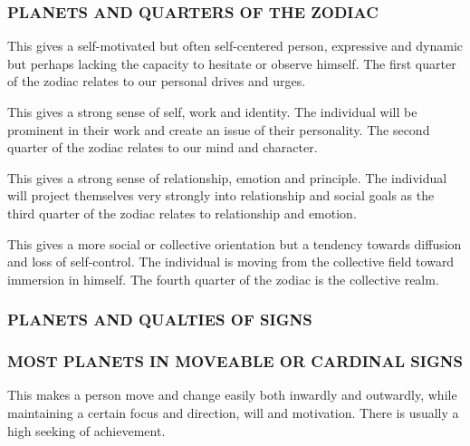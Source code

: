  

\subsubsection{PLANETS AND QUARTERS OF THE ZODIAC}


This gives a self-motivated but often self-centered person, expressive and dynamic but perhaps lacking the capacity to hesitate or observe himself. The first quarter of the zodiac relates to our personal drives and urges.

 


This gives a strong sense of self, work and identity. The individual will be prominent in their work and create an issue of their personality. The second quarter of the zodiac relates to our mind and character.

 


This gives a strong sense of relationship, emotion and principle. The individual will project themselves very strongly into relationship and social goals as the third quarter of the zodiac relates to relationship and emotion.

 


This gives a more social or collective orientation but a tendency towards diffusion and loss of self-control. The individual is moving from the collective field toward immersion in himself. The fourth quarter of the zodiac is the collective realm.

 

\subsubsection{PLANETS AND QUALTIES OF SIGNS}

\subsubsection{MOST PLANETS IN MOVEABLE OR CARDINAL SIGNS}

This makes a person move and change easily both inwardly and outwardly, while maintaining a certain focus and direction, will and motivation. There is usually a high seeking of achievement.


